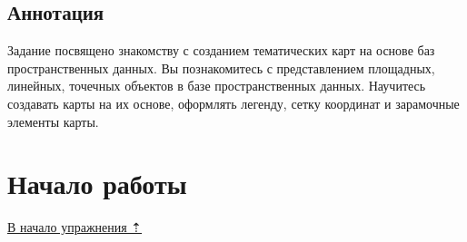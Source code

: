 \documentclass[]{book}
\theoremstyle{definition}
\theoremstyle{definition}
\theoremstyle{definition}
\theoremstyle{remark}
\begin{document}
\hypertarget{map-design-general-annotation}{%
\subsection{Аннотация}\label{map-design-general-annotation}}

Задание посвящено знакомству с созданием тематических карт на основе баз
пространственных данных. Вы познакомитесь с представлением площадных,
линейных, точечных объектов в базе пространственных данных. Научитесь
создавать карты на их основе, оформлять легенду, сетку координат и
зарамочные элементы карты.

\hypertarget{map-design-general-begin}{%
\section{Начало работы}\label{map-design-general-begin}}

\protect\hyperlink{map-design-general}{В начало упражнения ⇡}
\end{document}
